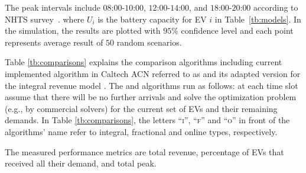 The peak intervals include $08$:$00$-$10$:$00$, $12$:$00$-$14$:$00$, and $18$:$00$-$20$:$00$ according to NHTS survey~\cite{Santos, Tang}.  where $U_i$ is the battery capacity for EV $i$ in Table~\ref{tb:models}.  
			In the simulation, the results are plotted with $95\%$ confidence level and each point represents average result of $50$ random scenarios. 

Table \ref{tb:comparisons} explains the comparison algorithms including current implemented algorithm in Caltech ACN referred to as \folp \cite{lee2018adaptive} and its adapted version for the integral revenue model \iolp. The \iolp and \folp algorithms run as follows: at each time slot assume that there will be no further arrivals and solve the optimization problem (e.g., by commercial solvers) for the current set of EVs and their remaining demands. In Table \ref{tb:comparisons}, the letters ``\textsc{i}'', ``\textsc{f}'' and ``\textsc{o}'' in front of the algorithms' name refer to integral, fractional and online types, respectively.
			
			The measured performance metrics are total revenue, percentage of EVs that received all their demand, and total peak.  
			

